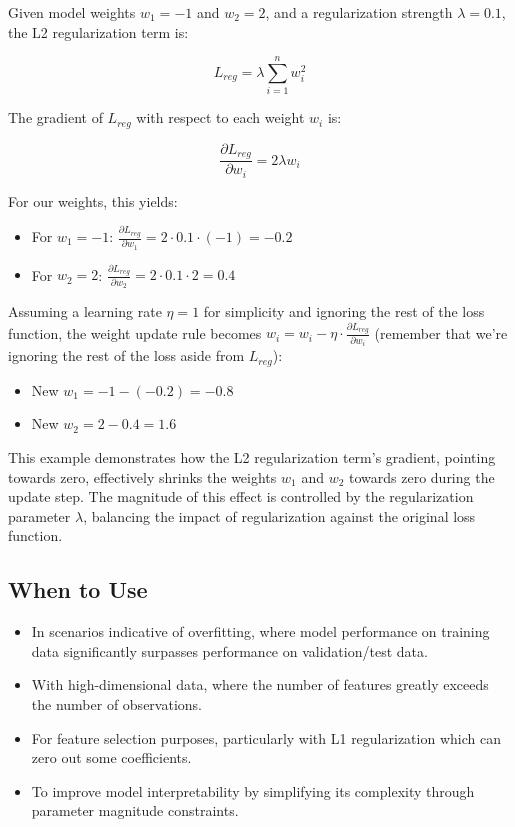 \documentclass[12pt]{article}
\begin{document}
Given model weights \(w_1 = -1\) and \(w_2 = 2\), and a regularization strength \(\lambda = 0.1\), the L2 regularization term is:

\[ L_{reg} = \lambda \sum_{i=1}^{n} w_i^2 \]

The gradient of \(L_{reg}\) with respect to each weight \(w_i\) is:

\[ \frac{\partial L_{reg}}{\partial w_i} = 2\lambda w_i \]

For our weights, this yields:

\begin{itemize}
    \item For \(w_1 = -1\): \(\frac{\partial L_{reg}}{\partial w_1} = 2 \cdot 0.1 \cdot (-1) = -0.2\)
    \item For \(w_2 = 2\): \(\frac{\partial L_{reg}}{\partial w_2} = 2 \cdot 0.1 \cdot 2 = 0.4\)
\end{itemize}

Assuming a learning rate \(\eta = 1\) for simplicity and ignoring the rest of the loss function, the weight update rule becomes \(w_i = w_i - \eta \cdot \frac{\partial L_{reg}}{\partial w_i}\) (remember that we're ignoring the rest of the loss aside from \(L_{reg}\)):

\begin{itemize}
    \item New \(w_1 = -1 - (-0.2) = -0.8\)
    \item New \(w_2 = 2 - 0.4 = 1.6\)
\end{itemize}

This example demonstrates how the L2 regularization term's gradient, pointing towards zero, effectively shrinks the weights \(w_1\) and \(w_2\) towards zero during the update step. The magnitude of this effect is controlled by the regularization parameter \(\lambda\), balancing the impact of regularization against the original loss function.


\subsection{When to Use}

\begin{itemize}
    \item In scenarios indicative of overfitting, where model performance on training data significantly surpasses performance on validation/test data.
    \item With high-dimensional data, where the number of features greatly exceeds the number of observations.
    \item For feature selection purposes, particularly with L1 regularization which can zero out some coefficients.
    \item To improve model interpretability by simplifying its complexity through parameter magnitude constraints.
\end{itemize}
\end{document}
